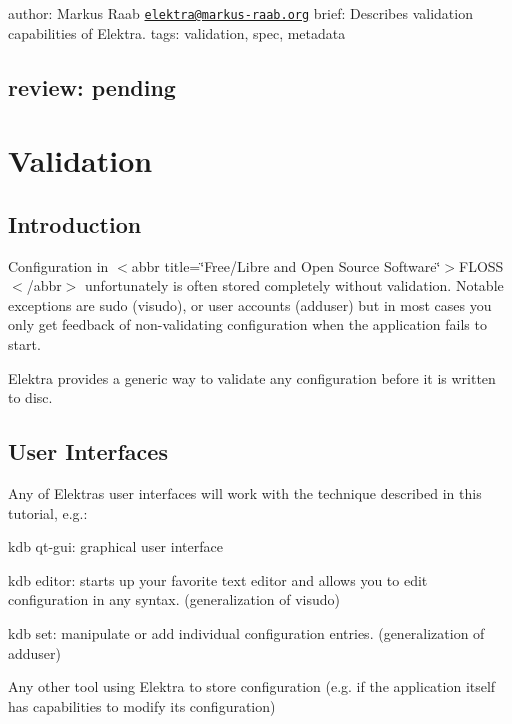 

 author\+: Markus Raab \href{mailto:elektra@markus-raab.org}{\tt elektra@markus-\/raab.\+org} brief\+: Describes validation capabilities of Elektra. tags\+: validation, spec, metadata \subsection*{review\+: pending }\hypertarget{md_doc_tutorials_validation_doc_tutorials_validation_md}{}\section{Validation}\label{md_doc_tutorials_validation_doc_tutorials_validation_md}
\subsection*{Introduction}

Configuration in $<$abbr title=\char`\"{}\+Free/\+Libre and Open Source Software\char`\"{}$>$F\+L\+O\+SS$<$/abbr$>$ unfortunately is often stored completely without validation. Notable exceptions are sudo ({\ttfamily visudo}), or user accounts ({\ttfamily adduser}) but in most cases you only get feedback of non-\/validating configuration when the application fails to start.

Elektra provides a generic way to validate any configuration before it is written to disc.

\subsection*{User Interfaces}

Any of Elektra\textquotesingle{}s user interfaces will work with the technique described in this tutorial, e.\+g.\+:


\begin{DoxyEnumerate}
\item {\ttfamily kdb qt-\/gui}\+: graphical user interface
\item {\ttfamily kdb editor}\+: starts up your favorite text editor and allows you to edit configuration in any syntax. (generalization of {\ttfamily visudo})
\item {\ttfamily kdb set}\+: manipulate or add individual configuration entries. (generalization of {\ttfamily adduser})
\item Any other tool using Elektra to store configuration (e.\+g. if the application itself has capabilities to modify its configuration)
\end{DoxyEnumerate}

